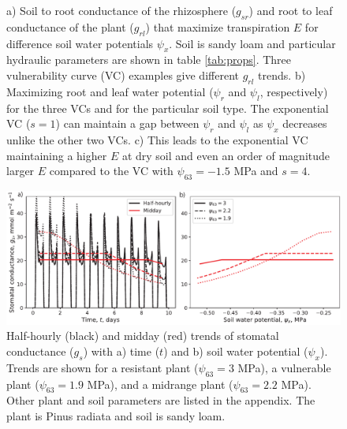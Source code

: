 \documentclass[utf8]{frontiersSCNS} %
\begin{document}
\begin{figure}[h]
    \caption{a) Soil to root conductance of the rhizosphere ($g_{sr}$) and root to leaf conductance of the plant ($g_{rl}$) that maximize transpiration $E$ for difference soil water potentials $\psi_x$. Soil is sandy loam and particular hydraulic parameters are shown in table \ref{tab:props}. Three vulnerability curve (VC) examples give different $g_{rl}$ trends. b) Maximizing root and leaf water potential ($\psi_r$ and $\psi_l$, respectively) for the three VCs and for the particular soil type. The exponential VC ($s=1$) can maintain a gap between $\psi_r$ and $\psi_l$ as $\psi_x$ decreases unlike the other two VCs. c) This leads to the exponential VC maintaining a higher $E$ at dry soil and even an order of magnitude larger $E$ compared to the VC with $\psi_{63}=-1.5$ MPa and $s=4$.}
    \label{fig:gmax_Emax_psix}
\end{figure}

\begin{figure}[h]
    \begin{center}
         \includegraphics[scale=0.75]{gs_resistant_vulnerable.pdf} 
    \end{center}
    \caption{Half-hourly (black) and midday (red) trends of stomatal conductance ($g_s$) with a) time ($t$) and b) soil water potential ($\psi_x$). Trends are shown for a resistant plant ($\psi_{63} = 3$ MPa), a vulnerable plant ($\psi_{63} = 1.9$ MPa), and a midrange plant ($\psi_{63} = 2.2$ MPa). Other plant and soil parameters are listed in the appendix. The plant is Pinus radiata and soil is sandy loam.}
    \label{fig:resistant_vulnerable_gs}
\end{figure}
\end{document}
